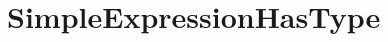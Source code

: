 \documentclass[11pt,a4paper]{article}
\begin{document}
\section{SimpleExpressionHasType}

\end{document}

